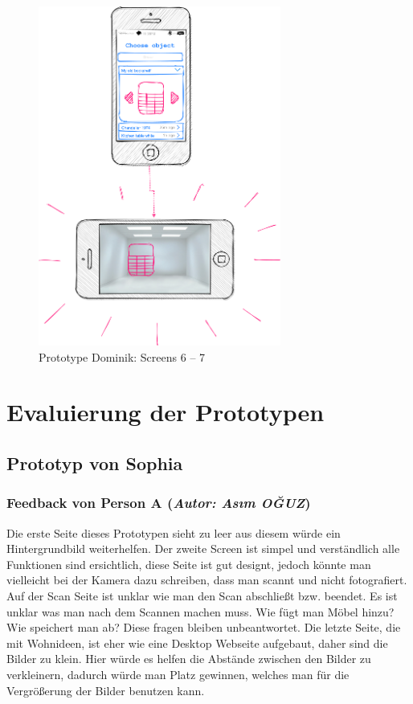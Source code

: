 \documentclass[12pt,paper=a4,oneside,hidelinks,headings=small,captions=heading,captions=nooneline]{scrartcl}
\begin{document}
\begin{figure}[htbp]
\centering
\includegraphics[height=422px]{./img/m2_lofi_dominik_67.png}
\caption{\label{fig:lofi_dominik_67}Prototype Dominik: Screens 6 -- 7}
\end{figure}
\section{Evaluierung der Prototypen}
\label{sec:org6108321}
\subsection{Prototyp von Sophia}
\label{sec:org1934dfa}

\subsubsection{\textbf{Feedback von Person A} (\emph{Autor: Asım OĞUZ})}
\label{sec:org5ebaf88}

Die erste Seite dieses Prototypen sieht zu leer aus diesem würde ein
Hintergrundbild weiterhelfen. Der zweite Screen ist simpel und
verständlich alle Funktionen sind ersichtlich, diese Seite ist gut
designt, jedoch könnte man vielleicht bei der Kamera dazu schreiben,
dass man scannt und nicht fotografiert. Auf der Scan Seite ist unklar
wie man den Scan abschließt bzw. beendet. Es ist unklar was man nach
dem Scannen machen muss. Wie fügt man Möbel hinzu? Wie speichert man
ab? Diese fragen bleiben unbeantwortet. Die letzte Seite, die mit
Wohnideen, ist eher wie eine Desktop Webseite aufgebaut, daher sind
die Bilder zu klein. Hier würde es helfen die Abstände zwischen den
Bilder zu verkleinern, dadurch würde man Platz gewinnen, welches man
für die Vergrößerung der Bilder benutzen kann.
\end{document}
